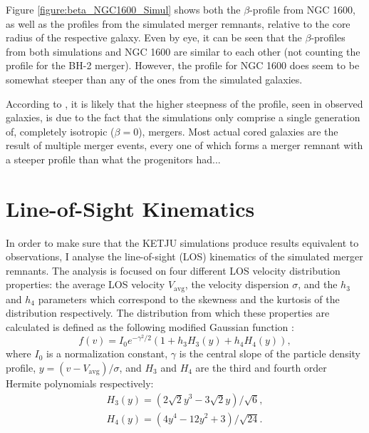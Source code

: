 \documentclass[english, oneside]{HYgradu}
\begin{document}
Figure \ref{figure:beta_NGC1600_Simul} shows both the $\beta$-profile from NGC 1600, as well as the profiles from the simulated merger remnants, relative to the core radius of the respective galaxy. Even by eye, it can be seen that the $\beta$-profiles from both simulations and NGC 1600 are similar to each other (not counting the profile for the BH-2 merger). However, the profile for NGC 1600 does seem to be somewhat steeper than any of the ones from the simulated galaxies.

According to \cite{Rantala2018}, it is likely that the higher steepness of the profile, seen in observed galaxies, is due to the fact that the simulations only comprise a single generation of, completely isotropic ($\beta = 0$), mergers. Most actual cored galaxies are the result of multiple merger events, every one of which forms a merger remnant with a steeper profile than what the progenitors had...

\section{Line-of-Sight Kinematics}

In order to make sure that the KETJU simulations produce results equivalent to observations, I analyse the line-of-sight (LOS) kinematics of the simulated merger remnants. The analysis is focused on four different LOS velocity distribution properties: the average LOS velocity $V_\mathrm{avg}$, the velocity dispersion $\sigma$, and the $h_3$ and $h_4$ parameters which correspond to the skewness and the kurtosis of the distribution respectively. The distribution from which these properties are calculated is defined as the following modified Gaussian function \citep{VanDerMarel1993, Bender1994}:
\begin{equation}
f(v) = I_0 e^{-\gamma^2/2}(1 + h_3 H_3(y) + h_4 H_4(y)), \label{eq:mod_gaussian}
\end{equation} 
where $I_0$ is a normalization constant, $\gamma$ is the central slope of the particle density profile, $y = (v - V_\mathrm{avg})/\sigma$, and $H_3$ and $H_4$ are the third and fourth order Hermite polynomials respectively:
\begin{eqnarray}
H_3(y) = \left(2\sqrt{2}y^3 - 3\sqrt{2}y\right) / \sqrt{6}, \\
H_4(y) = \left(4y^4 - 12y^2 + 3 \right) / \sqrt{24}.
\end{eqnarray}
\end{document}
